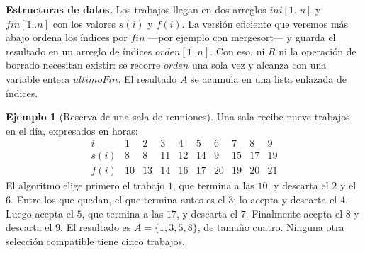 \documentclass[12pt, spanish, oneside, openany]{book}
\newenvironment{estructuras}%
  {\begin{center}\begin{minipage}{0.93\textwidth}\begin{mdframed}[style=estrbox]%
   \small\textbf{Estructuras de datos.}\;}%
  {\end{mdframed}\end{minipage}\end{center}}
\theoremstyle{uprightplain}
\theoremstyle{definition}
\newtheorem{ejemplo}[teorema]{Ejemplo}
\theoremstyle{remark}
\theoremstyle{definition}
\begin{document}
\begin{estructuras}
Los trabajos llegan en dos arreglos $\mathit{ini}[1..n]$ y $\mathit{fin}[1..n]$
con los valores $s(i)$ y $f(i)$. La versión eficiente que veremos más abajo
ordena los índices por $\mathit{fin}$ ---por ejemplo con mergesort--- y guarda
el resultado en un arreglo de índices $\mathit{orden}[1..n]$. Con eso, ni $R$
ni la operación de borrado necesitan existir: se recorre $\mathit{orden}$ una
sola vez y alcanza con una variable entera $\mathit{ultimoFin}$. El resultado
$A$ se acumula en una lista enlazada de índices.
\end{estructuras}

\begin{ejemplo}[Reserva de una sala de reuniones]
\label{ej:sala-reuniones}
Una sala recibe nueve trabajos en el día, expresados en horas:
\[
\begin{array}{c|ccccccccc}
i & 1 & 2 & 3 & 4 & 5 & 6 & 7 & 8 & 9\\\hline
s(i) & 8 & 8 & 11 & 12 & 14 & 9 & 15 & 17 & 19\\
f(i) & 10 & 13 & 14 & 16 & 17 & 20 & 19 & 20 & 21
\end{array}
\]
El algoritmo elige primero el trabajo $1$, que termina a las $10$, y descarta el $2$ y el $6$. Entre los que quedan, el que termina antes es el $3$; lo acepta y descarta el $4$. Luego acepta el $5$, que termina a las $17$, y descarta el $7$. Finalmente acepta el $8$ y descarta el $9$. El resultado es $A=\{1,3,5,8\}$, de tamaño cuatro. Ninguna otra selección compatible tiene cinco trabajos.
\end{ejemplo}
\end{document}
